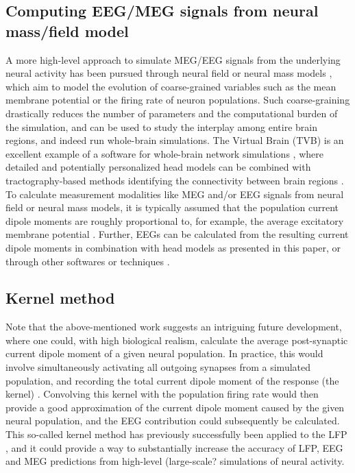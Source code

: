 \documentclass[preprint,10pt,authoryear]{elsarticle}
\newcommand{\gex}[1]{{\color{Orange}#1}}
\begin{document}
\gex{\subsection{Computing EEG/MEG signals from neural mass/field model}}
A more high-level approach to simulate MEG/EEG signals from the underlying neural activity has been pursued through neural field or neural mass models \citep{Jirsa2002, David2003, Coombes2006, Deco2008, Bojak2010, Ritter2013}, which aim to model the evolution of coarse-grained variables such as the mean membrane potential or the firing rate of neuron populations. Such coarse-graining drastically reduces the number of parameters and the computational burden of the simulation, and can be used to study the interplay among entire brain regions, and indeed run whole-brain simulations. 
The Virtual Brain (TVB) is an excellent example of a software for whole-brain network simulations \citep{TVB, Sanz-Leon2015, Ritter2013}, where detailed and potentially personalized head models can be combined with tractography-based methods identifying the connectivity between brain regions \citep{TVB}. To calculate measurement modalities like MEG and/or EEG signals from neural field or neural mass models, it is typically assumed that the population current dipole moments are roughly proportional to, for example, the average excitatory membrane potential \citep{Bojak2010, Ritter2013}. Further, EEGs can be calculated from the resulting current dipole moments in combination with head models as presented in this paper, or through other softwares or techniques \citep{Gramfort2014}.

\gex{\subsection{Kernel method}}
Note that the above-mentioned work suggests an intriguing future development, where one could, with high biological realism, calculate the average post-synaptic current dipole moment of a given neural population. In practice, this would involve simultaneously activating all outgoing synapses from a simulated population, and recording the total current dipole moment of the response (the kernel) \citep{HAGEN2016}. Convolving this kernel with the population firing rate would then provide a good approximation of the current dipole moment caused by the given neural population, and the EEG contribution could subsequently be calculated. This so-called kernel method has previously successfully been applied to the LFP \citep{HAGEN2016, Skaar2020, Telenczuk2020}, and it could provide a way to substantially increase the accuracy of LFP, EEG and MEG predictions from high-level \gex{(large-scale?} simulations of neural activity.  
\end{document}
